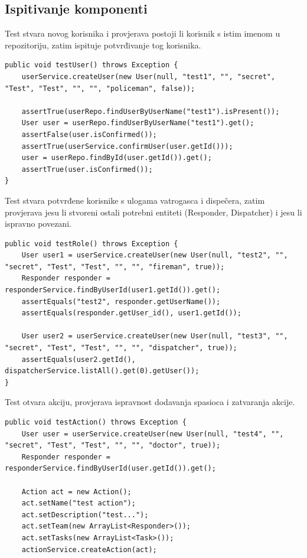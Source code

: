 			\subsection{Ispitivanje komponenti}
			\begin{packed_enum}
			
				\item Test stvara novog korisnika i provjerava postoji li korisnik s istim imenom u repozitoriju, zatim ispituje potvrđivanje tog korisnika.
				\begin{lstlisting}
public void testUser() throws Exception {
	userService.createUser(new User(null, "test1", "", "secret", "Test", "Test", "", "", "policeman", false));
	
	assertTrue(userRepo.findUserByUserName("test1").isPresent());
	User user = userRepo.findUserByUserName("test1").get();
	assertFalse(user.isConfirmed());
	assertTrue(userService.confirmUser(user.getId()));
	user = userRepo.findById(user.getId()).get();
	assertTrue(user.isConfirmed());
}
				\end{lstlisting}
				\item Test stvara potvrđene korisnike s ulogama vatrogasca i dispečera, zatim provjerava jesu li stvoreni ostali potrebni entiteti (Responder, Dispatcher) i jesu li ispravno povezani.
				\begin{lstlisting}
public void testRole() throws Exception {
	User user1 = userService.createUser(new User(null, "test2", "", "secret", "Test", "Test", "", "", "fireman", true));
	Responder responder = responderService.findByUserId(user1.getId()).get();
	assertEquals("test2", responder.getUserName());
	assertEquals(responder.getUser_id(), user1.getId());
	
	User user2 = userService.createUser(new User(null, "test3", "", "secret", "Test", "Test", "", "", "dispatcher", true));
	assertEquals(user2.getId(), dispatcherService.listAll().get(0).getUser());
}
				\end{lstlisting}
				\item Test otvara akciju, provjerava ispravnost dodavanja spasioca i zatvaranja akcije.
				\begin{lstlisting}
public void testAction() throws Exception {
	User user = userService.createUser(new User(null, "test4", "", "secret", "Test", "Test", "", "", "doctor", true));
	Responder responder = responderService.findByUserId(user.getId()).get();
	
	Action act = new Action();
	act.setName("test action");
	act.setDescription("test...");
	act.setTeam(new ArrayList<Responder>());
	act.setTasks(new ArrayList<Task>());
	actionService.createAction(act);
	

\end{lstlisting}
\end{packed_enum}
